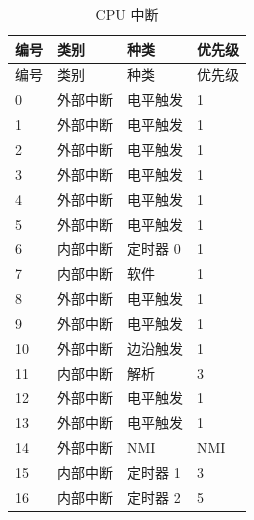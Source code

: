 \begin{longtable}[c]{ |p{1.5cm}|p{4.5cm}|p{4.5cm}|p{4cm}| }

    \caption{CPU 中断}
    \label{table:CPUInterrupt}
    \\\hline
    \rowcolor{lightgray}
   编号 & 类别     & 种类              & 优先级    \\
    \hline
    \endfirsthead
    
    \hline
    \rowcolor{lightgray}
   编号 & 类别      & 种类             & 优先级    \\
    \hline
    \endhead
    
    \endfoot
    
    \hline
    \endlastfoot
    
    0   & 外部中断    & 电平触发   & 1                 \\
    \hline
    1   & 外部中断    & 电平触发   & 1                 \\
    \hline
    2   & 外部中断    & 电平触发   & 1                 \\
    \hline
    3   & 外部中断    & 电平触发   & 1                 \\
    \hline
    4   & 外部中断    & 电平触发   & 1                 \\
    \hline
    5   & 外部中断    & 电平触发   & 1                 \\
    \hline
    6   & 内部中断      & 定时器 0           & 1                 \\
    \hline
    7   & 内部中断      & 软件          & 1                 \\
    \hline
    8   & 外部中断    & 电平触发   & 1                 \\
    \hline
    9   & 外部中断    & 电平触发   & 1                 \\
    \hline
    10  & 外部中断    & 边沿触发    & 1                 \\
    \hline
    11  & 内部中断      & 解析         & 3                 \\
    \hline
    12  & 外部中断    & 电平触发   & 1                 \\
    \hline
    13  & 外部中断    & 电平触发   & 1                 \\
    \hline
    14  & 外部中断    & NMI               & NMI               \\
    \hline
    15  & 内部中断      & 定时器 1           & 3                 \\
    \hline
    16  & 内部中断      & 定时器 2           & 5                 \\

\end{longtable}
